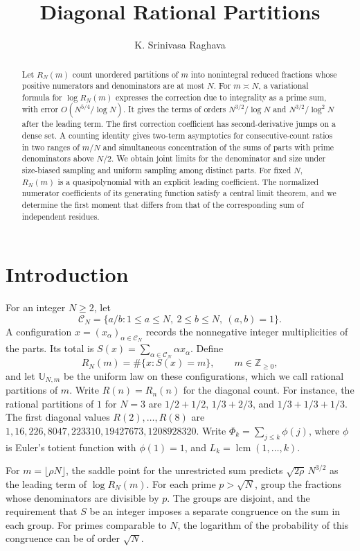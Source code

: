 \documentclass[11pt]{amsart}
\title{Diagonal Rational Partitions}
\author{K. Srinivasa Raghava}
\theoremstyle{remark}
\DeclareMathOperator{\lcm}{lcm}
\newcommand{\Z}{\mathbb Z}
\begin{document}
\begin{abstract}
Let \(R_N(m)\) count unordered partitions of \(m\) into nonintegral reduced fractions whose positive numerators and denominators are at most \(N\). For \(m\asymp N\), a variational formula for \(\log R_N(m)\) expresses the correction due to integrality as a prime sum, with error \(O(N^{5/4}/\log N)\). It gives the terms of orders \(N^{3/2}/\log N\) and \(N^{3/2}/\log^2 N\) after the leading term. The first correction coefficient has second-derivative jumps on a dense set. A counting identity gives two-term asymptotics for consecutive-count ratios in two ranges of \(m/N\) and simultaneous concentration of the sums of parts with prime denominators above \(N/2\). We obtain joint limits for the denominator and size under size-biased sampling and uniform sampling among distinct parts. For fixed \(N\), \(R_N(m)\) is a quasipolynomial with an explicit leading coefficient. The normalized numerator coefficients of its generating function satisfy a central limit theorem, and we determine the first moment that differs from that of the corresponding sum of independent residues.
\end{abstract}
\maketitle

\section{Introduction}

For an integer \(N\ge2\), let
\[
 \mathcal C_N=\{a/b:1\le a\le N,\ 2\le b\le N,\ (a,b)=1\}.
\]
A configuration \(x=(x_\alpha)_{\alpha\in\mathcal C_N}\) records the
nonnegative integer multiplicities of the parts. Its total is
\(S(x)=\sum_{\alpha\in\mathcal C_N}\alpha x_\alpha\). Define
\[
 R_N(m)=\#\{x:S(x)=m\},\qquad m\in\Z_{\ge0},
\]
and let \(\mathbb U_{N,m}\) be the uniform law on these configurations, which we call rational partitions of \(m\). Write \(R(n)=R_n(n)\) for the diagonal count. For instance, the rational partitions of \(1\) for \(N=3\) are \(1/2+1/2\), \(1/3+2/3\), and \(1/3+1/3+1/3\). The first diagonal values \(R(2),\ldots,R(8)\) are \(1,16,226,8047,223310,19427673,1208928320\). Write \(\Phi_k=\sum_{j\le k}\phi(j)\), where \(\phi\) is Euler's totient function with \(\phi(1)=1\), and \(L_k=\lcm(1,\ldots,k)\).

For \(m=\lfloor\rho N\rfloor\), the saddle point for the unrestricted sum predicts \(\sqrt{2\rho}\,N^{3/2}\) as the leading term of \(\log R_N(m)\). For each prime \(p>\sqrt N\), group the fractions whose denominators are divisible by \(p\). The groups are disjoint, and the requirement that \(S\) be an integer imposes a separate congruence on the sum in each group. For primes comparable to \(N\), the logarithm of the probability of this congruence can be of order \(\sqrt N\).
\end{document}
